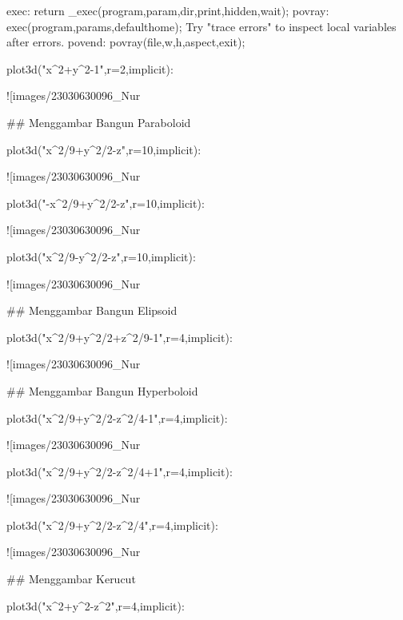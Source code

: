 \documentclass{article}
\begin{document}
    exec:
        return _exec(program,param,dir,print,hidden,wait);
    povray:
        exec(program,params,defaulthome);
    Try "trace errors" to inspect local variables after errors.
    povend:
        povray(file,w,h,aspect,exit); 

\>plot3d("x^2+y^2-1",r=2,\>implicit):


![images/23030630096_Nur%

## Menggambar Bangun Paraboloid

\>plot3d("x^2/9+y^2/2-z",r=10,\>implicit):


![images/23030630096_Nur%

\>plot3d("-x^2/9+y^2/2-z",r=10,\>implicit):


![images/23030630096_Nur%

\>plot3d("x^2/9-y^2/2-z",r=10,\>implicit):


![images/23030630096_Nur%

## Menggambar Bangun Elipsoid

\>plot3d("x^2/9+y^2/2+z^2/9-1",r=4,\>implicit):


![images/23030630096_Nur%

## Menggambar Bangun Hyperboloid

\>plot3d("x^2/9+y^2/2-z^2/4-1",r=4,\>implicit):


![images/23030630096_Nur%

\>plot3d("x^2/9+y^2/2-z^2/4+1",r=4,\>implicit):


![images/23030630096_Nur%

\>plot3d("x^2/9+y^2/2-z^2/4",r=4,\>implicit):


![images/23030630096_Nur%

## Menggambar Kerucut

\>plot3d("x^2+y^2-z^2",r=4,\>implicit):
\end{document}
